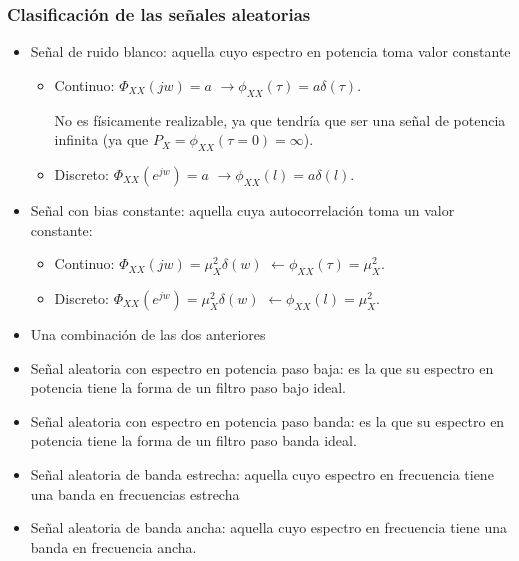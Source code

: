 
\begin{frame}
\frametitle{Clasificación de las señales aleatorias}
\vspace{-0.2cm}
\footnotesize
\begin{itemize}
\footnotesize
\item Señal de ruido blanco: aquella cuyo espectro en potencia toma valor constante
\begin{itemize}
\footnotesize
\scriptsize
\item Continuo: $\Phi_{XX}(jw)=a$   $\rightarrow \phi_{XX}(\tau)=a\delta(\tau)$.

\vspace{0.1cm}

 No es físicamente realizable, ya que tendría que ser una señal de potencia infinita (ya que $P_X=\phi_{XX}(\tau=0)=\infty$). 
 
 \vspace{0.1cm}
 
 \item Discreto: $\Phi_{XX}(e^{jw})=a $  $\rightarrow \phi_{XX}(l)=a \delta(l)$.
 
 
\end{itemize}

\item Señal con bias constante: aquella cuya autocorrelación toma un valor constante:
\begin{itemize}
\footnotesize
\scriptsize
\item Continuo: $\Phi_{XX}(jw)=\mu^2_X \delta(w)$   $\leftarrow \phi_{XX}(\tau)=\mu^2_X$.

\vspace{0.1cm}

 \item Discreto: $\Phi_{XX}(e^{jw})=\mu^2_X \delta(w)$   $\leftarrow \phi_{XX}(l)=\mu^2_X$.

 
 \vspace{0.1cm}
 
 
\end{itemize}


 \item Una combinación de las dos anteriores
 
 \item Señal aleatoria con espectro en potencia paso baja: es la que su espectro en potencia tiene la forma de un filtro paso bajo ideal.
 
 \item Señal aleatoria con espectro en potencia paso banda: es la que su espectro en potencia tiene la forma de un filtro paso banda ideal.

\item Señal aleatoria de banda estrecha: aquella cuyo espectro en frecuencia tiene una banda en frecuencias estrecha

\item Señal aleatoria de banda ancha: aquella cuyo espectro en frecuencia tiene una banda en frecuencia ancha.


\end{itemize}
\end{frame}


